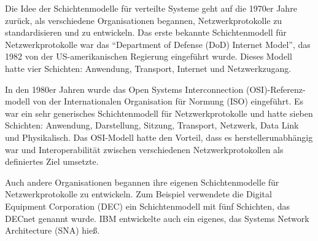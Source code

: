 \documentclass[../vs-script-first-v01.tex]{subfiles}
\begin{document}
Die Idee der Schichtenmodelle für verteilte Systeme geht auf die 1970er Jahre zurück, als verschiedene Organisationen begannen, Netzwerkprotokolle zu standardisieren und zu entwickeln. Das erste bekannte Schichtenmodell für Netzwerkprotokolle war das \enquote{Department of Defense (DoD) Internet Model}, das 1982 von der US-amerikanischen Regierung eingeführt wurde. Dieses Modell hatte vier Schichten: Anwendung, Transport, Internet und Netzwerkzugang.

In den 1980er Jahren wurde das Open Systems Interconnection (OSI)-Referenz-modell von der Internationalen Organisation für Normung (ISO) eingeführt. Es war ein sehr generisches Schichtenmodell für Netzwerkprotokolle und hatte sieben Schichten: Anwendung, Darstellung, Sitzung, Transport, Netzwerk, Data Link und Physikalisch. Das OSI-Modell hatte den Vorteil, dass es herstellerunabhängig war und Interoperabilität zwischen verschiedenen Netzwerkprotokollen als definiertes Ziel umsetzte.

Auch andere Organisationen begannen ihre eigenen Schichtenmodelle für Netzwerkprotokolle zu entwickeln. Zum Beispiel verwendete die Digital Equipment Corporation (DEC) ein Schichtenmodell mit fünf Schichten, das DECnet genannt wurde. IBM entwickelte auch ein eigenes, das Systems Network Architecture (SNA) hieß.
\end{document}
